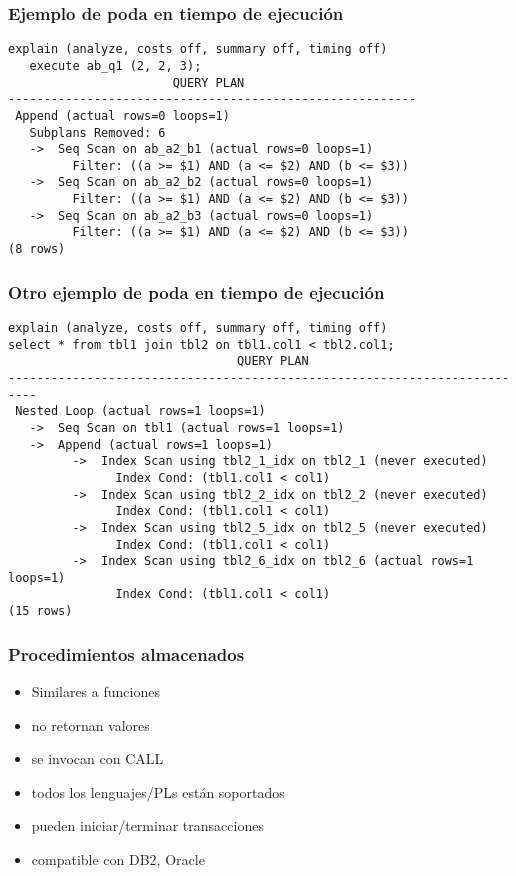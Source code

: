 \begin{frame}[fragile]
  \frametitle{Ejemplo de poda en tiempo de ejecución}
\footnotesize
\begin{lstlisting}
explain (analyze, costs off, summary off, timing off)
   execute ab_q1 (2, 2, 3);
                       QUERY PLAN                        
---------------------------------------------------------
 Append (actual rows=0 loops=1)
   Subplans Removed: 6
   ->  Seq Scan on ab_a2_b1 (actual rows=0 loops=1)
         Filter: ((a >= $1) AND (a <= $2) AND (b <= $3))
   ->  Seq Scan on ab_a2_b2 (actual rows=0 loops=1)
         Filter: ((a >= $1) AND (a <= $2) AND (b <= $3))
   ->  Seq Scan on ab_a2_b3 (actual rows=0 loops=1)
         Filter: ((a >= $1) AND (a <= $2) AND (b <= $3))
(8 rows)
\end{lstlisting}
\end{frame}

\begin{frame}[fragile]
  \frametitle{Otro ejemplo de poda en tiempo de ejecución}
\footnotesize
\begin{lstlisting}
explain (analyze, costs off, summary off, timing off)
select * from tbl1 join tbl2 on tbl1.col1 < tbl2.col1;
                                QUERY PLAN                                
--------------------------------------------------------------------------
 Nested Loop (actual rows=1 loops=1)
   ->  Seq Scan on tbl1 (actual rows=1 loops=1)
   ->  Append (actual rows=1 loops=1)
         ->  Index Scan using tbl2_1_idx on tbl2_1 (never executed)
               Index Cond: (tbl1.col1 < col1)
         ->  Index Scan using tbl2_2_idx on tbl2_2 (never executed)
               Index Cond: (tbl1.col1 < col1)
         ->  Index Scan using tbl2_5_idx on tbl2_5 (never executed)
               Index Cond: (tbl1.col1 < col1)
         ->  Index Scan using tbl2_6_idx on tbl2_6 (actual rows=1 loops=1)
               Index Cond: (tbl1.col1 < col1)
(15 rows)
\end{lstlisting}

\end{frame}

\begin{frame}
  \frametitle{Procedimientos almacenados}

\begin{itemize}
  \item Similares a funciones
  \item no retornan valores
  \item se invocan con CALL
  \item todos los lenguajes/PLs están soportados
  \item pueden iniciar/terminar transacciones
  \item compatible con DB2, Oracle
\end{itemize}

\end{frame}

